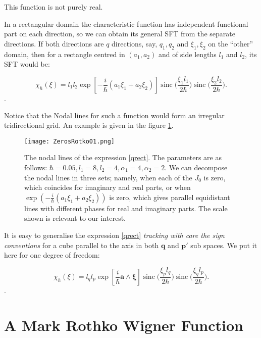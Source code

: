\documentclass[a4paper,12pt]{article}
\newcommand{\ihb}{\frac{i}{\hbar}}
\newcommand{\qfase}{\mathbf{q}}
\newcommand{\pfase}{\mathbf{p}}
\newcommand{\xifase}{ {\boldsymbol{\xi}} }
\DeclareMathOperator*{\sinc}{sinc}
\begin{document}
This function is not purely real.

In a rectangular domain the characteristic function has independent
functional part on each direction, so we can obtain its general
SFT from the separate directions. If both directions are $q$ directions,
say, $q_1, q_2$ and $\xi_1, \xi_2$ on the ``other''  domain,  then
for a rectangle centred in $(a_1, a_2)$ and of side lengths
$l_1$ and $l_2$, its SFT would be:


\begin{equation}\label{qrect}
\chi_h (\xi)=l_1 l_2 
\exp [-\ihb (a_1 \xi_1 + a_2 \xi_2)]
\sinc \Big( \frac{\xi_1 l_1}{2 \hbar} \Big)
\sinc \Big( \frac{\xi_2 l_2  }{ 2 \hbar} \Big).
\end{equation}.

Notice that the Nodal lines for such a function would form an
irregular tridirectional grid. An example is given in the 
figure \ref{example01}.

\begin{figure}
\centering
\texttt{[image: ZerosRotko01.png]}
\caption{The nodal lines of the expression \ref{qrect}.
The parameters are as follows: $\hbar=0.05, l_1=8,
l_2=4, \alpha_1=4, \alpha_2=2$. We can decompose
the nodal lines in three sets; namely, when each of
the $J_0$ is zero, which coincides for imaginary and real
parts, or when $\exp(-\ihb (a_1 \xi_1 + a_2 \xi_2))$ is zero, which
gives parallel equidistant lines with different phases for real
and imaginary parts. 
The scale  shown is relevant to our
interest.}\label{example01}
\end{figure}

It is easy to generalise the  expression \ref{qrect} 
\emph{tracking with care the sign conventions}
for a cube parallel to
the axis in both $\qfase$ and $\pfase'$ sub spaces. We put it here
for one degree of freedom:

\begin{equation}\label{total}
\chi_h (\xi)=l_q l_p
\exp [\ihb \mathbf{a}\wedge\xifase]
\sinc \Big( \frac{\xi_p l_q}{2\hbar} \Big)
\sinc \Big( \frac{\xi_q l_p}{2\hbar} \Big).
\end{equation}.


\section{A Mark Rothko Wigner Function}
\end{document}
